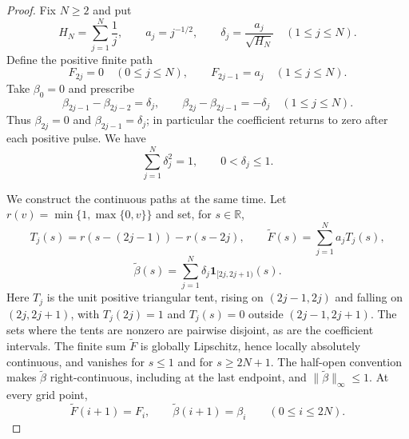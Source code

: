 \documentclass[11pt]{article}
\numberwithin{equation}{section}
\theoremstyle{remark}
\theoremstyle{definition}
\begin{document}
\begin{proof}
Fix $N\ge2$ and put
\[
 H_N=\sum_{j=1}^N\frac1j,\qquad
 a_j=j^{-1/2},\qquad \delta_j=\frac{a_j}{\sqrt{H_N}}
 \quad(1\le j\le N).
\]
Define the positive finite path
\begin{equation}\label{eq:abstract-F-definition}
 F_{2j}=0\quad(0\le j\le N),
 \qquad F_{2j-1}=a_j\quad(1\le j\le N).
\end{equation}
Take $\beta_0=0$ and prescribe
\begin{equation}\label{eq:abstract-beta-increments}
 \beta_{2j-1}-\beta_{2j-2}=\delta_j,
 \qquad \beta_{2j}-\beta_{2j-1}=-\delta_j
 \quad(1\le j\le N).
\end{equation}
Thus $\beta_{2j}=0$ and $\beta_{2j-1}=\delta_j$; in particular the
coefficient returns to zero after each positive pulse.  We have
\[
 \sum_{j=1}^N\delta_j^2=1,\qquad 0<\delta_j\le1.
\]

We construct the continuous paths at the same time.  Let
$r(v)=\min\{1,\max\{0,v\}\}$ and set, for $s\in\mathbb R$,
\[
 T_j(s)=r(s-(2j-1))-r(s-2j),\qquad
 \widetilde F(s)=\sum_{j=1}^Na_jT_j(s),
\]
\[
 \widetilde\beta(s)=\sum_{j=1}^N\delta_j\mathbf1_{[2j,2j+1)}(s).
\]
Here $T_j$ is the unit positive triangular tent, rising on
$(2j-1,2j)$ and falling on $(2j,2j+1)$, with $T_j(2j)=1$ and
$T_j(s)=0$ outside $(2j-1,2j+1)$.
The sets where the tents are nonzero are pairwise disjoint, as are the
coefficient intervals.  The finite sum $\widetilde F$ is globally
Lipschitz, hence locally absolutely continuous, and vanishes for
$s\le1$ and for $s\ge2N+1$.  The half-open convention makes
$\widetilde\beta$ right-continuous, including at the last endpoint,
and $\|\widetilde\beta\|_\infty\le1$.  At every grid point,
\[
 \widetilde F(i+1)=F_i,\qquad
 \widetilde\beta(i+1)=\beta_i\qquad(0\le i\le2N).
\]


\end{proof}
\end{document}

